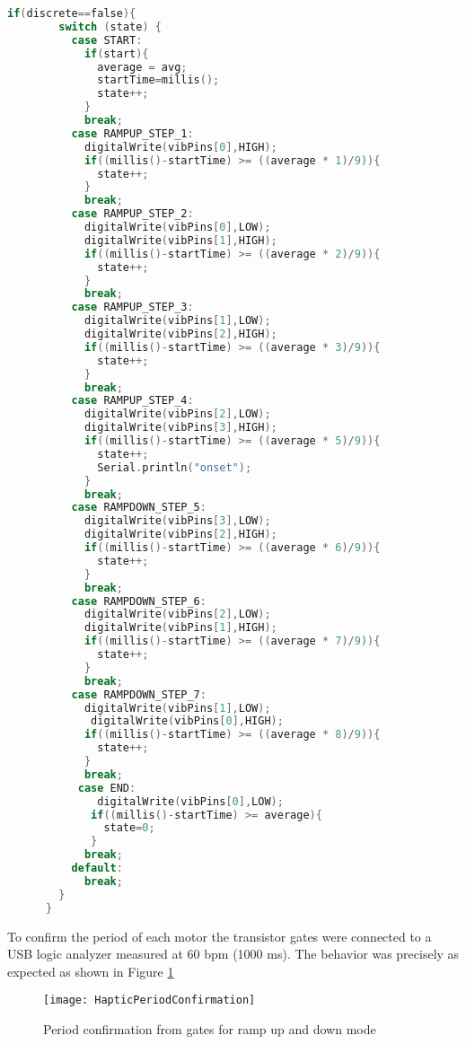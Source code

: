 \begin{lstlisting}[language=C]
    if(discrete==false){
        switch (state) {
          case START:
            if(start){
              average = avg;
              startTime=millis(); 
              state++;
            }
            break;
          case RAMPUP_STEP_1:
            digitalWrite(vibPins[0],HIGH);
            if((millis()-startTime) >= ((average * 1)/9)){
              state++;
            }
            break;
          case RAMPUP_STEP_2:
            digitalWrite(vibPins[0],LOW);
            digitalWrite(vibPins[1],HIGH);
            if((millis()-startTime) >= ((average * 2)/9)){
              state++;
            }
            break;
          case RAMPUP_STEP_3:
            digitalWrite(vibPins[1],LOW);
            digitalWrite(vibPins[2],HIGH);
            if((millis()-startTime) >= ((average * 3)/9)){
              state++;
            }
            break;
          case RAMPUP_STEP_4:
            digitalWrite(vibPins[2],LOW);
            digitalWrite(vibPins[3],HIGH);
            if((millis()-startTime) >= ((average * 5)/9)){
              state++;
              Serial.println("onset");
            }
            break;
          case RAMPDOWN_STEP_5:
            digitalWrite(vibPins[3],LOW);
            digitalWrite(vibPins[2],HIGH);
            if((millis()-startTime) >= ((average * 6)/9)){
              state++;
            }
            break;
          case RAMPDOWN_STEP_6:
            digitalWrite(vibPins[2],LOW);
            digitalWrite(vibPins[1],HIGH);
            if((millis()-startTime) >= ((average * 7)/9)){
              state++;
            }
            break;
          case RAMPDOWN_STEP_7:
            digitalWrite(vibPins[1],LOW);
             digitalWrite(vibPins[0],HIGH);
            if((millis()-startTime) >= ((average * 8)/9)){
              state++;
            }
            break;
           case END:
              digitalWrite(vibPins[0],LOW);
             if((millis()-startTime) >= average){
               state=0; 
             }
            break;
          default:
            break;
        }
      }
\end{lstlisting}

To confirm the period of each motor the transistor gates were connected to a USB logic analyzer measured at 60 bpm (1000 ms). The behavior was precisely as expected as shown in Figure \ref{HPC}
\begin{figure}[H]\label{HPC}
    \centering
    \texttt{[image: HapticPeriodConfirmation]}
    \caption{Period confirmation from gates for ramp up and down mode}
\end{figure}
